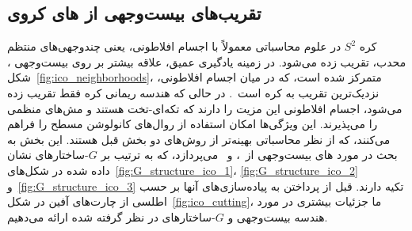 

\subsection{تقریب‌های بیست‌وجهی از های کروی}
\label{sec:spherical_CNNs_icosahedral}

کره $S^2$ در علوم محاسباتی معمولاً با اجسام افلاطونی، یعنی چندوجهی‌های منتظم محدب، تقریب زده می‌شود.
در زمینه یادگیری عمیق، علاقه بیشتر بر روی بیست‌وجهی  ، شکل~\ref{fig:ico_neighborhoods}، متمرکز شده است، که در میان اجسام افلاطونی، نزدیک‌ترین تقریب به کره است~\cite{schroder1995spherical}.
در حالی که هندسه ریمانی کره فقط تقریب زده می‌شود، اجسام افلاطونی این مزیت را دارند که تکه‌ای-تخت هستند و مش‌های منظمی را می‌پذیرند.
این ویژگی‌ها امکان استفاده از روال‌های کانولوشن مسطح را فراهم می‌کنند، که از نظر محاسباتی بهینه‌تر از روش‌های دو بخش قبل هستند.
این بخش به بحث در مورد های بیست‌وجهی از~\cite{liu2018icoAltAz}، \cite{zhang2019orientation} و~\cite{gaugeIco2019} می‌پردازد، که به ترتیب بر $G$-ساختارهای نشان داده شده در شکل‌های~\ref{fig:G_structure_ico_1}، \ref{fig:G_structure_ico_2} و~\ref{fig:G_structure_ico_3} تکیه دارند.
قبل از پرداختن به پیاده‌سازی‌های آنها بر حسب اطلسی از چارت‌های آفين در شکل~\ref{fig:ico_cutting}،
ما جزئیات بیشتری در مورد هندسه بیست‌وجهی و $G$-ساختارهای در نظر گرفته شده ارائه می‌دهیم.



